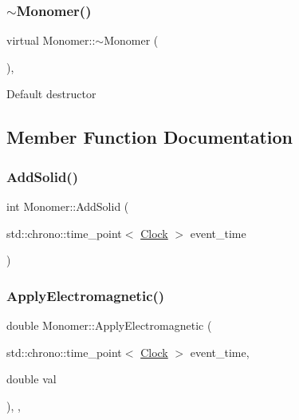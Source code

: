 \mbox{\label{classMonomer_a802bf239fc55d16783736393edbd6899}} 
\subsubsection{\texorpdfstring{$\sim$\+Monomer()}{~Monomer()}}
{\footnotesize\ttfamily virtual Monomer\+::$\sim$\+Monomer (\begin{DoxyParamCaption}{ }\end{DoxyParamCaption})\hspace{0.3cm}{\ttfamily [inline]}, {\ttfamily [virtual]}}

Default destructor 

\subsection{Member Function Documentation}
\mbox{\label{classMonomer_ac03023c0d1bb67e5f11091af7ad3735d}} 
\subsubsection{\texorpdfstring{Add\+Solid()}{AddSolid()}}
{\footnotesize\ttfamily int Monomer\+::\+Add\+Solid (\begin{DoxyParamCaption}\item[{std\+::chrono\+::time\+\_\+point$<$ \mbox{\hyperlink{universe_8h_a0ef8d951d1ca5ab3cfaf7ab4c7a6fd80}{Clock}} $>$}]{event\+\_\+time }\end{DoxyParamCaption})}

\mbox{\label{classMonomer_ae64dfbf82610ae26427be9c824aef70f}} 
\subsubsection{\texorpdfstring{Apply\+Electromagnetic()}{ApplyElectromagnetic()}}
{\footnotesize\ttfamily double Monomer\+::\+Apply\+Electromagnetic (\begin{DoxyParamCaption}\item[{std\+::chrono\+::time\+\_\+point$<$ \mbox{\hyperlink{universe_8h_a0ef8d951d1ca5ab3cfaf7ab4c7a6fd80}{Clock}} $>$}]{event\+\_\+time,  }\item[{double}]{val }\end{DoxyParamCaption})\hspace{0.3cm}{\ttfamily [inline]}, {\ttfamily [final]}, {\ttfamily [virtual]}}



